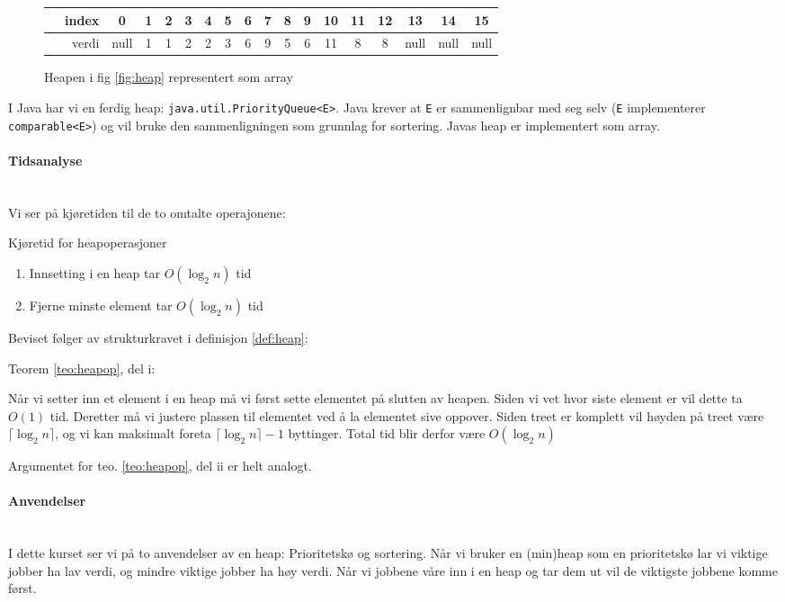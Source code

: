 \begin{figure}[H]
\centering
\caption{Heapen i fig \ref{fig:heap} representert som array}
\begin{tabular}{r||c|c|c|c|c|c|c|c|c|c|c|c|c|c|c|c}
	~~index &  0   & 1 & 2 & 3 & 4 & 5 & 6 & 7 & 8 & 9 & 10 & 11 & 12 &  13  &  14  &  15  \\ \hline
	~~verdi & null & 1 & 1 & 2 & 2 & 3 & 6 & 9 & 5 & 6 & 11 & 8  & 8  & null & null & null 
\end{tabular}
\end{figure}

I Java har vi en ferdig heap: \verb|java.util.PriorityQueue<E>|. Java krever at \verb|E| er sammenlignbar med seg selv (\verb|E| implementerer \verb|comparable<E>|) og vil bruke den sammenligningen som grunnlag for sortering. Javas heap er implementert som array. 

\paragraph{Tidsanalyse}~\\
Vi ser på kjøretiden til de to omtalte operajonene:
\begin{teorem} Kjøretid for heapoperasjoner \label{teo:heapop}
\begin{enumerate}[i]
\item Innsetting i en heap tar $ O(\log_2 n) $ tid
\item Fjerne minste element tar $ O(\log_2 n) $ tid
\end{enumerate}
\end{teorem}
Beviset følger av strukturkravet i definisjon \ref{def:heap}:
\begin{bevis} Teorem \ref{teo:heapop}, del i:

Når vi setter inn et element i en heap må vi først sette elementet på slutten av heapen. Siden vi vet hvor siste element er vil dette ta $ O(1) $ tid. Deretter må vi justere plassen til elementet ved å la elementet sive oppover. Siden treet er komplett vil høyden på treet være $ \lceil\log_2 n\rceil $, og vi kan maksimalt foreta $ \lceil\log_2 n\rceil - 1 $ byttinger. Total tid blir derfor være $ O(\log_2 n) $
\end{bevis}
Argumentet for teo. \ref{teo:heapop}, del ii er helt analogt. 


\paragraph{Anvendelser}~\\
I dette kurset ser vi på to anvendelser av en heap: Prioritetskø og sortering. Når vi bruker en (min)heap som en prioritetskø lar vi viktige jobber ha lav verdi, og mindre viktige jobber ha høy verdi. Når vi jobbene våre inn i en heap og tar dem ut vil de viktigste jobbene komme først.

